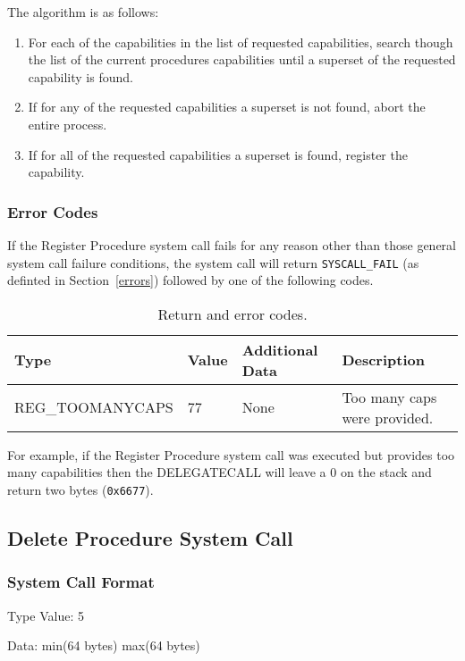 \documentclass[english,a4paper]{article}
\let\oldparagraph\subsubsection
\renewcommand{\subsubsection}[1]{\oldparagraph{#1}\mbox{}}
\begin{document}
The algorithm is as follows:

\begin{enumerate}
  \item For each of the capabilities in the list of requested capabilities,
  search though the list of the current procedures capabilities until a superset
  of the requested capability is found.
  \item If for any of the requested capabilities a superset is not found, abort
  the entire process.
  \item If for all of the requested capabilities a superset is found, register
  the capability.
\end{enumerate}

\subsubsection{Error Codes}
If the Register Procedure system call fails for any reason other than those
general system call failure conditions, the system call will return
\texttt{SYSCALL\_FAIL} (as definted in Section~\ref{errors}) followed by one of
the following codes.

\begin{table}[H]
  \caption{Return and error codes.}
  \centering{}%
  \begin{tabular}{l|l|p{}|p{}}
    \hline
    Type & Value & Additional Data & Description\tabularnewline
    \hline
    \hline
    REG\_TOOMANYCAPS  & 77 & None & Too many caps were provided. \tabularnewline
    \hline
  \end{tabular}
\end{table}

For example, if the Register
Procedure system call was executed but provides too many capabilities then the
DELEGATECALL will leave a 0 on the stack and return two bytes (\texttt{0x6677}).

\subsection{Delete Procedure System Call}

\subsubsection{System Call Format}
Type Value: 5

Data: min(64 bytes) max(64 bytes)
\end{document}
